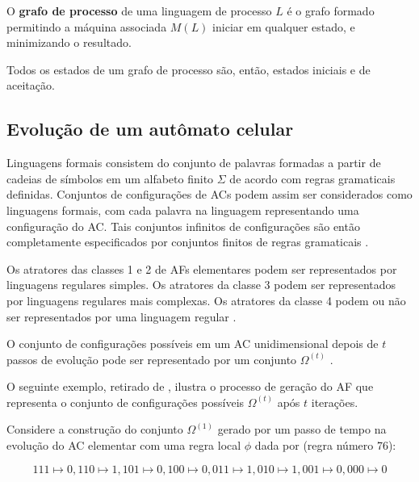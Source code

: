 \documentclass[12pt,a4paper]{article}
\newenvironment{definition}[1][Definição]{\begin{trivlist}
\item[\hskip \labelsep {\bfseries #1}]}{\end{trivlist}}
\begin{document}
\begin{definition}
O \textbf{grafo de processo} de uma linguagem de processo $L$ é o grafo
formado permitindo a máquina associada $M(L)$ iniciar em qualquer estado,
e minimizando o resultado.
\end{definition}

Todos os estados de um grafo de processo são, então, estados iniciais e de
aceitação.

\subsection{Evolução de um autômato celular}

Linguagens formais consistem do conjunto de palavras formadas a partir de
cadeias de símbolos em um alfabeto finito $\Sigma$ de acordo com regras
gramaticais definidas. Conjuntos de configurações de ACs
podem assim ser considerados como linguagens formais, com cada palavra na
linguagem representando uma configuração do AC. Tais conjuntos
infinitos de configurações são então completamente especificados por
conjuntos finitos de regras gramaticais .

Os atratores das classes 1 e 2 de AFs elementares podem ser
representados por linguagens regulares simples. Os atratores da classe 3 podem
ser representados por linguagens regulares mais complexas. Os atratores da
classe 4 podem ou não ser representados por uma linguagem regular .

O conjunto de configurações possíveis em um AC unidimensional depois de $t$
passos de evolução pode ser representado por um conjunto $\Omega^{(t)}$
.

O seguinte exemplo, retirado de , ilustra o processo de
geração do AF que representa o conjunto de configurações
possíveis $\Omega^{(t)}$ após $t$ iterações.

Considere a construção do conjunto $\Omega^{(1)}$ gerado por um passo de
tempo na evolução do AC elementar com uma regra
local $\phi$ dada por (regra número 76):

\begin{equation}\label{eqn:r76}
111 \mapsto 0, 110 \mapsto 1, 101 \mapsto 0, 100 \mapsto 0, 011 \mapsto 1, 010 \mapsto 1,
001 \mapsto 0, 000 \mapsto 0
\end{equation}
\end{document}
